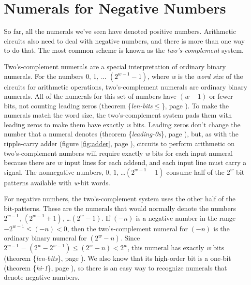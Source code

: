 \section{Numerals for Negative Numbers}
\label{sec:negative-numerals}

So far, all the numerals we've seen have denoted positive numbers.
Arithmetic circuits also need to deal with negative numbers,
and there is more than one way to do that.
The most common scheme is known as the \emph{two's-complement} system.

Two's-complement
numerals are a special interpretation of
ordinary binary numerals.
For the numbers $0$, $1$, $\dots$ $(2^{w-1}-1)$,
where \emph{w} is the \emph{word size}
of the circuits for arithmetic operations,
two's-complement numerals are ordinary binary numerals.
All of the numerals for this set of numbers
have $(w-1)$ or fewer bits,
not counting leading zeros
(theorem \{\emph{len-bits}$\le$\}, page \pageref{len-bitsLE}).
To make the numerals match the word size,
the two's-complement system pads them with leading zeros
to make them have exactly \emph{w} bits.
Leading zeros don't change the number that a numeral denotes
(theorem \{\emph{leading-0s}\}, page \pageref{leading-0s}), but,
as with the ripple-carry adder (figure \ref{fig:adder}, page \pageref{fig:adder}),
circuits to perform arithmetic on two's-complement numbers will
require exactly \emph{w} bits for each input numeral
because there are $w$ input lines for each addend,
and each input line must carry a signal.
The nonnegative numbers, $0$, $1$, \dots $(2^{w-1}-1)$
consume half of the $2^w$ bit-patterns available with
\emph{w}-bit words.

For negative numbers,
the two's-complement system uses the other half of the bit-patterns.
These are the numerals that would normally denote the numbers
$2^{w-1}$, $(2^{w-1}+1)$, \dots $(2^{w}-1)$.
If $(-n)$ is a negative number in the range $-2^{w-1} \leq (-n) < 0$,
\label{2s-def}
then the two's-complement numeral for $(-n)$
is the ordinary binary numeral for $(2^w - n)$.
Since $2^{w-1} = (2^{w}-2^{w-1}) \leq (2^w - n) < 2^w$,
this numeral has exactly \emph{w} bits
(theorem \{\emph{len-bits}\}, page \pageref{len-bits}).
We also know that its high-order bit is a one-bit
(theorem \{\emph{hi-1}\}, page \pageref{hi-1}),
so there is an easy way to recognize numerals that denote negative numbers.

